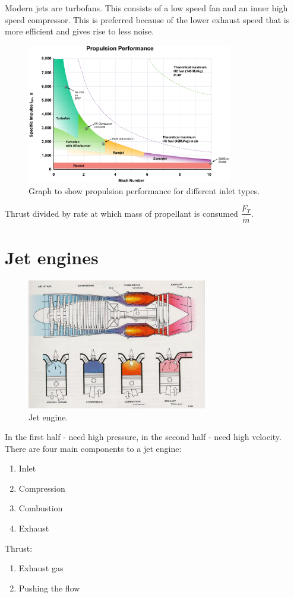 \documentclass[class=report, crop=false, 12pt,a4paper]{standalone}
\begin{document}
Modern jets are turbofans. This consists of a low speed fan and an inner high speed compressor. This is preferred because of the lower exhaust speed that is more efficient and gives rise to less noise.
\begin{figure}[H]
    \centering
    \includegraphics[width = 0.8\textwidth]{../img/diagram42.png}
    \caption{Graph to show propulsion performance for different inlet types.}
\end{figure}
Thrust divided by rate at which mass of propellant is consumed $\dfrac{F_T}{\dot{m}}$.
\section{Jet engines}
\begin{figure}[H]
    \centering
    \includegraphics[width = 0.7\textwidth]{../img/diagram43.png}
    \caption{Jet engine.}
\end{figure}
In the first half - need high pressure, in the second half - need high velocity. There are four main components to a jet engine:
\begin{enumerate}
    \item Inlet
    \item Compression
    \item Combustion
    \item Exhaust
\end{enumerate}
Thrust:
\begin{enumerate}
    \item Exhaust gas
    \item Pushing the flow
\end{enumerate}
\end{document}
